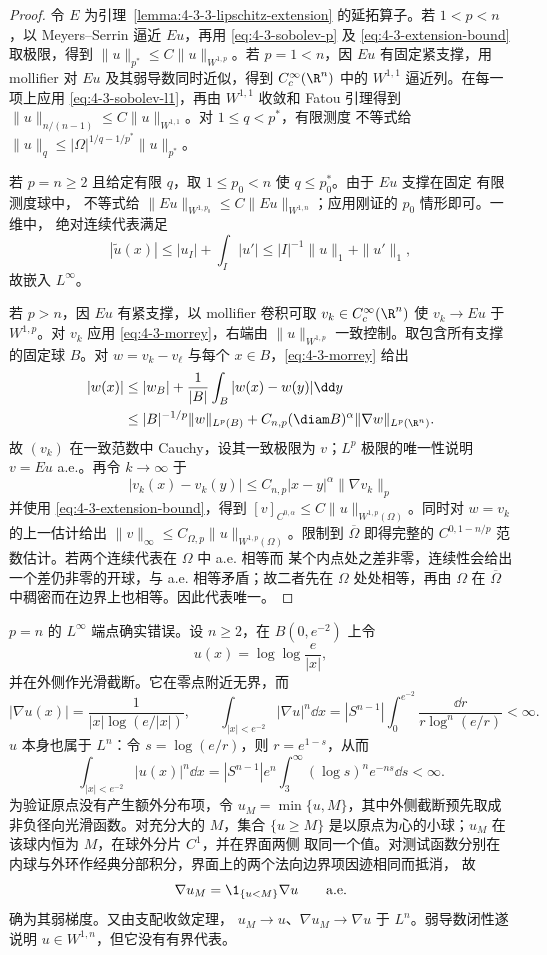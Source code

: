 \begin{proof}
令 $E$ 为引理~\ref{lemma:4-3-3-lipschitz-extension} 的延拓算子。若 $1<p<n$，以
Meyers--Serrin 逼近 $Eu$，再用 \eqref{eq:4-3-sobolev-p} 及
\eqref{eq:4-3-extension-bound} 取极限，得到
$\|u\|_{p^*}\leq C\|u\|_{W^{1,p}}$。若 $p=1<n$，因 $Eu$ 有固定紧支撑，用 mollifier 对
$Eu$ 及其弱导数同时近似，得到 $C_c^\infty(\R^n)$ 中的 $W^{1,1}$ 逼近列。在每一项上应用
\eqref{eq:4-3-sobolev-l1}，再由 $W^{1,1}$ 收敛和 Fatou 引理得到
$\|u\|_{n/(n-1)}\le C\|u\|_{W^{1,1}}$。对 $1\leq q<p^*$，有限测度 \Holder{} 不等式给
$\|u\|_q\leq|\Omega|^{1/q-1/p^*}\|u\|_{p^*}$。

若 $p=n\geq2$ 且给定有限 $q$，取 $1\leq p_0<n$ 使 $q\leq p_0^*$。由于 $Eu$ 支撑在固定
有限测度球中，\Holder{} 不等式给
$\|Eu\|_{W^{1,p_0}}\leq C\|Eu\|_{W^{1,n}}$；应用刚证的 $p_0$ 情形即可。一维中，
绝对连续代表满足
\[
 |\widetilde u(x)|
 \leq |u_I|+\int_I|u'|
 \leq |I|^{-1}\|u\|_1+\|u'\|_1,
\]
故嵌入 $L^\infty$。

若 $p>n$，因 $Eu$ 有紧支撑，以 mollifier 卷积可取
$v_k\in C_c^\infty(\R^n)$ 使 $v_k\to Eu$ 于 $W^{1,p}$。对 $v_k$ 应用
\eqref{eq:4-3-morrey}，右端由 $\|u\|_{W^{1,p}}$ 一致控制。取包含所有支撑的固定球 $B$。对
$w=v_k-v_\ell$ 与每个 $x\in B$，\eqref{eq:4-3-morrey} 给出
\[
 \begin{aligned}
 |w(x)|
 &\leq |w_B|+\frac1{|B|}\int_B|w(x)-w(y)|\dd y\\
 &\leq |B|^{-1/p}\|w\|_{L^p(B)}
   +C_{n,p}(\diam B)^\alpha\|\nabla w\|_{L^p(\R^n)}.
 \end{aligned}
\]
故 $(v_k)$ 在一致范数中 Cauchy，设其一致极限为 $v$；$L^p$ 极限的唯一性说明
$v=Eu$ a.e.。再令 $k\to\infty$ 于
\[
 |v_k(x)-v_k(y)|\leq C_{n,p}|x-y|^\alpha\|\nabla v_k\|_p
\]
并使用 \eqref{eq:4-3-extension-bound}，得到
$[v]_{C^{0,\alpha}}\leq C\|u\|_{W^{1,p}(\Omega)}$。同时对 $w=v_k$ 的上一估计给出
$\|v\|_\infty\leq C_{\Omega,p}\|u\|_{W^{1,p}(\Omega)}$。限制到
$\overline\Omega$ 即得完整的 $C^{0,1-n/p}$ 范数估计。若两个连续代表在 $\Omega$ 中 a.e. 相等而
某个内点处之差非零，连续性会给出一个差仍非零的开球，与 a.e. 相等矛盾；故二者先在 $\Omega$
处处相等，再由 $\Omega$ 在 $\overline\Omega$ 中稠密而在边界上也相等。因此代表唯一。
\end{proof}

$p=n$ 的 $L^\infty$ 端点确实错误。设 $n\geq2$，在 $B(0,e^{-2})$ 上令
\[
 u(x)=\log\log\frac e{|x|},
\]
并在外侧作光滑截断。它在零点附近无界，而
\[
 |\nabla u(x)|=\frac1{|x|\log(e/|x|)},
\qquad
 \int_{|x|<e^{-2}}|\nabla u|^n\dd x
 =|S^{n-1}|\int_0^{e^{-2}}\frac{\dd r}{r\log^n(e/r)}<\infty.
\]
$u$ 本身也属于 $L^n$：令 $s=\log(e/r)$，则 $r=e^{1-s}$，从而
\[
 \int_{|x|<e^{-2}}|u(x)|^n\dd x
 =|S^{n-1}|e^n\int_3^\infty(\log s)^n e^{-ns}\dd s<\infty.
\]
为验证原点没有产生额外分布项，令
$u_M=\min\{u,M\}$，其中外侧截断预先取成非负径向光滑函数。对充分大的 $M$，集合
$\{u\geq M\}$ 是以原点为心的小球；$u_M$ 在该球内恒为 $M$，在球外分片 $C^1$，并在界面两侧
取同一个值。对测试函数分别在内球与外环作经典分部积分，界面上的两个法向边界项因迹相同而抵消，
故
\[
 \nabla u_M=\1_{\{u<M\}}\nabla u\qquad\text{a.e.}
\]
确为其弱梯度。又由支配收敛定理，
$u_M\to u$、$\nabla u_M\to\nabla u$ 于 $L^n$。弱导数闭性遂说明
$u\in W^{1,n}$，但它没有有界代表。

